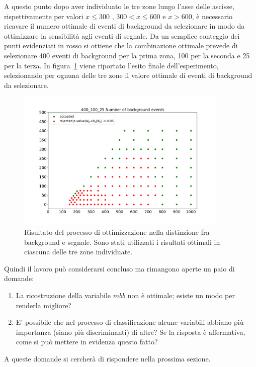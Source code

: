 A questo punto dopo aver individuato le tre zone lungo l'asse delle ascisse, rispettivamente per valori $ x \le 300$ , $300 < x \le 600$ e $x > 600$, è necessario ricavare il numero ottimale di eventi di background da selezionare in modo da ottimizzare la sensibilità agli eventi di segnale. Da un semplice conteggio dei punti evidenziati in rosso si ottiene che la combinazione ottimale prevede di selezionare 400 eventi di background per la prima zona, 100 per la seconda e 25 per la terza. In figura~\ref{mix} viene riportato l'esito finale dell'esperimento, selezionando per ognuna delle tre zone il valore ottimale di eventi di background da selezionare.

\begin{figure}[h!]
	\centering
	\includegraphics[width=0.90\textwidth]{figs/risultati_simulazione/mix.pdf}
	\caption{Risultato del processo di ottimizzazione nella distinzione fra background e segnale. Sono stati utilizzati i risultati ottimali in ciascuna delle tre zone individuate.}
	\label{mix}
\end{figure}

Quindi il lavoro può considerarsi concluso ma rimangono aperte un paio di domande:
\begin{enumerate}
	\item La ricostruzione della variabile $\textit{mbb}$ non è ottimale; esiste un modo per renderla migliore?
	\item E' possibile che nel processo di classificazione alcune variabili abbiano più importanza (siano più discriminanti) di altre? Se la risposta è affermativa, come si può mettere in evidenza questo fatto?
\end{enumerate} 
A queste domande si cercherà di rispondere nella prossima sezione.\\

